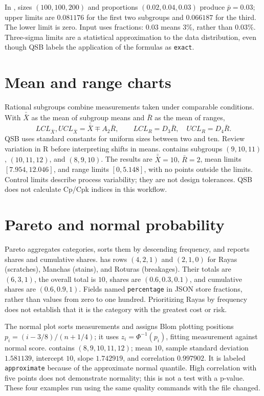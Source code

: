 In , sizes
\((100,100,200)\) and proportions \((0.02,0.04,0.03)\) produce
\(\bar p=0.03\); upper limits are \(0.081176\) for the first two
subgroups and \(0.066187\) for the third. The lower limit is zero.
Input uses fractions: \(0.03\) means \(3\%\), rather than \(0.03\%\).
Three-sigma limits are a statistical approximation to the data distribution,
even though QSB labels the application of the formulas as \texttt{exact}.

\section{Mean and range charts}
Rational subgroups combine measurements taken under comparable conditions.
With \(\bar{\bar X}\) as the mean of subgroup means and \(\bar R\)
as the mean of ranges,
\[
 LCL_{\bar X},UCL_{\bar X}=\bar{\bar X}\mp A_2\bar R,\qquad
 LCL_R=D_3\bar R,\quad UCL_R=D_4\bar R.
\]
QSB uses standard constants for uniform sizes between two and ten. Review
variation in R before interpreting shifts in means.
 contains subgroups \((9,10,11)\), \((10,11,12)\),
and \((8,9,10)\). The results are \(\bar{\bar X}=10\), \(\bar R=2\),
mean limits \([7.954,12.046]\), and range limits \([0,5.148]\), with no
points outside the limits. Control limits describe process variability; they
are not design tolerances. QSB does not calculate Cp/Cpk indices in this
workflow.

\section{Pareto and normal probability}
Pareto aggregates categories, sorts them by descending frequency, and reports
shares and cumulative shares.  has rows \((4,2,1)\)
and \((2,1,0)\) for Rayas (scratches), Manchas (stains), and Roturas
(breakages). Their totals are \((6,3,1)\), the overall total is \(10\),
shares are \((0.6,0.3,0.1)\), and cumulative shares are \((0.6,0.9,1)\).
Fields named \texttt{percentage} in JSON store fractions, rather than values
from zero to one hundred. Prioritizing Rayas by frequency does not establish
that it is the category with the greatest cost or risk.

The normal plot sorts measurements and assigns Blom plotting positions
\(p_i=(i-3/8)/(n+1/4)\); it uses \(z_i=\Phi^{-1}(p_i)\), fitting
measurement against normal score.  contains
\((8,9,10,11,12)\); mean \(10\), sample standard deviation \(1.581139\),
intercept \(10\), slope \(1.742919\), and correlation \(0.997902\).
It is labeled \texttt{approximate} because of the approximate normal quantile.
High correlation with five points does not demonstrate normality; this is not
a test with a p-value. These four examples run using the same quality commands
with the file changed.

